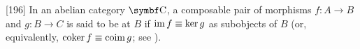 \begin{definition}\label{def:exact_morphism_pair}\cite{MacLane1994}[196]
  In an abelian category \( \Cat{C} \), a composable pair of morphisms \( f: A \to B \) and \( g: B \to C \) is said to be  at \( B \) if \( \operatorname{im} f \equiv \ker g \) as subobjects of \( B \) (or, equivalently, \( \operatorname{co}\!\ker f \equiv \operatorname{co}\!\operatorname{im} g \); see ).
\end{definition}
